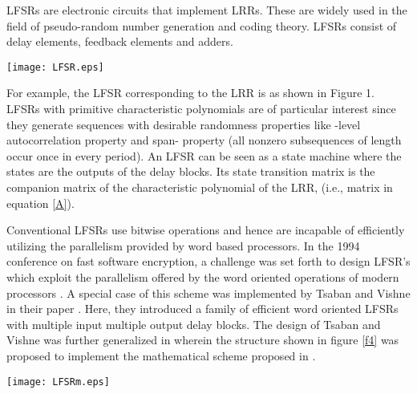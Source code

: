 \documentclass[letterpaper, 12 pt]{article}  \usepackage{amssymb}
\begin{document}
LFSRs are electronic circuits that implement LRRs. These are widely used
in the field of pseudo-random number generation and coding theory. LFSRs
consist
of delay elements, feedback elements and adders. 
 {\small
 \begin{figure*}[h]
  \label{spiderman}
       \centering
       \texttt{[image: LFSR.eps]}
 \begin{center}
  \caption{Linear Feedback Shift Register}
 \end{center}
  \end{figure*}
 }
For example, the LFSR corresponding to the LRR  is as shown in Figure 1. LFSRs with
primitive characteristic polynomials are of particular interest since they
generate
sequences with desirable randomness properties like  -level
autocorrelation property and span- property (all nonzero subsequences of
length  occur once in every period)\cite{Golomb}.
An LFSR can be seen as a state machine where the states are the outputs of the
delay blocks. Its state transition matrix is the companion matrix of the
characteristic polynomial of the LRR, (i.e., matrix  in equation \eqref{A}).


Conventional LFSRs use bitwise operations and hence are incapable of 
efficiently utilizing the parallelism provided by word based processors. In the
1994 conference on fast software encryption, a challenge was set
forth to design LFSR's which exploit the parallelism offered by the word
oriented operations of modern processors \cite{Preneel}.  A
special case of this scheme was implemented by Tsaban and Vishne
in their  paper \cite{Tsabman}. Here, they
introduced a family of efficient word oriented LFSRs with multiple input
multiple output delay blocks. 
The design of Tsaban and Vishne was further generalized in \cite{zeng} wherein
the structure shown in figure \ref{f4} was proposed to implement the
mathematical scheme proposed in \cite{Neider2}. 
\begin{figure*}[h]
     
\begin{center}
\texttt{[image: LFSRm.eps]}
 \caption{Linear Feedback Shift Register with m-Input m-Output Delay Blocks}
\label{f4}
\end{center}      
\end{figure*}
\end{document}
